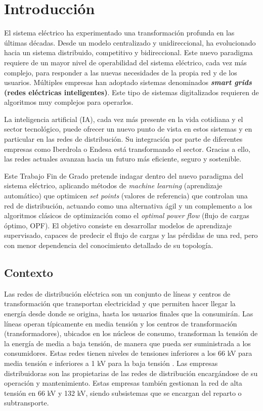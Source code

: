 \chapter{Introducción}\label{cap:introduccion}

El sistema eléctrico ha experimentado una transformación profunda en las últimas décadas. Desde un modelo centralizado y unidireccional, ha evolucionado hacia un sistema distribuido, competitivo y bidireccional. Este nuevo paradigma requiere de un mayor nivel de operabilidad del sistema eléctrico, cada vez más complejo, para responder a las nuevas necesidades de la propia red y de los usuarios. Múltiples empresas han adoptado sistemas denominados \textbf{\textit{smart grids} (redes eléctricas inteligentes)}. Este tipo de sistemas digitalizados requieren de algoritmos muy complejos para operarlos.

La inteligencia artificial (IA), cada vez más presente en la vida cotidiana y el sector tecnológico, puede ofrecer un nuevo punto de vista en estos sistemas y en particular en las redes de distribución. Su integración por parte de diferentes empresas como Iberdrola o Endesa está transformando el sector. Gracias a ello, las redes actuales avanzan hacia un futuro más eficiente, seguro y sostenible.

Este Trabajo Fin de Grado pretende indagar dentro del nuevo paradigma del sistema eléctrico, aplicando métodos de \textit{machine learning} (aprendizaje automático) que optimicen \textit{set points} (valores de referencia) que controlan una red de distribución, actuando como una alternativa ágil y un complemento a los algoritmos clásicos de optimización como el \textit{optimal power flow} (flujo de cargas óptimo, OPF). El objetivo consiste en desarrollar modelos de aprendizaje supervisado, capaces de predecir el flujo de cargas y las pérdidas de una red, pero con menor dependencia del conocimiento detallado de su topología.

\section{Contexto}
Las redes de distribución eléctrica son un conjunto de líneas y centros de transformación que transportan electricidad y que permiten hacer llegar la energía desde donde se origina, hasta los usuarios finales que la consumirán. Las líneas operan típicamente en media tensión y los centros de transformación (transformadores), ubicados en los núcleos de consumo, transforman la tensión de la energía de media a baja tensión, de manera que pueda ser suministrada a los consumidores. Estas redes tienen niveles de tensiones inferiores a los 66 kV para media tensión e inferiores a 1 kV para la baja tensión \cite{iberdrola-red-distribucion}. Las empresas distribuidoras son las propietarias de las redes de distribución encargándose de su operación y mantenimiento. Estas empresas también gestionan la red de alta tensión en 66 kV y 132 kV, siendo subsistemas que se encargan del reparto o subtransporte. 

